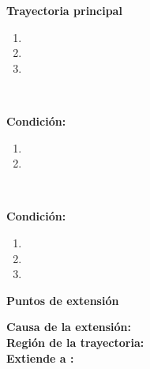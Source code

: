 

\begin{large}
	\textbf{Trayectoria principal}\\
\end{large}	

\begin{enumerate}[1.]

	
	\item \actor
	
	\item \sistema 
	
	\item \finCU	

\end{enumerate}



\begin{large}
	\\
\end{large}	
\textbf{Condición:} \textit{}

\begin{enumerate}[{A-}1.]

	\item \sistema

	\item \finCU

\end{enumerate}


\begin{large}
	\\
\end{large}	
\textbf{Condición:} \textit{}

\begin{enumerate}[{B-}1.]

	\item \actor

	\item \sistema

	\item \finCU

\end{enumerate}





\begin{large}
	\textbf{Puntos de extensión}\\
\end{large}	

\textbf{Causa de la extensión:} \\
\textbf{Región de la trayectoria:} \\
\textbf{Extiende a :} \\\\


